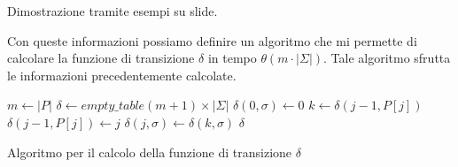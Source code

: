\begin{nota}
    Dimostrazione tramite esempi su slide.
\end{nota}
Con queste informazioni possiamo definire un algoritmo che mi permette di calcolare
la funzione di transizione $\delta$ in tempo $\theta(m \cdot |\Sigma|)$. Tale
algoritmo sfrutta le informazioni precedentemente calcolate.
\begin{algorithm}[!ht]
    \begin{algorithmic}
        \State $m \gets |P|$
        \State $\delta \gets empty\_table (m + 1) \times | \Sigma|$
        \For{$\sigma \in \Sigma$}
        \State $\delta(0, \sigma) \gets 0$
        \EndFor
        \State $k \gets \delta(j - 1, P[j])$
        \State $\delta(j - 1, P[j]) \gets j$
        \For{$\sigma \in \Sigma$}
        \State $\delta(j, \sigma) \gets \delta(k, \sigma)$
        \EndFor
        \EndFor
        \State \Return $\delta$
        \EndFunction
    \end{algorithmic}
    \caption{Algoritmo per il calcolo della funzione di transizione $\delta$}
\end{algorithm}
